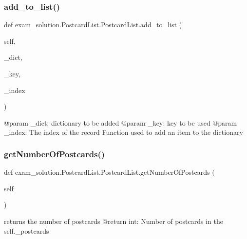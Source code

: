 \subsubsection{\texorpdfstring{add\_to\_list()}{add\_to\_list()}}
{\footnotesize\ttfamily def exam\+\_\+solution.\+Postcard\+List.\+Postcard\+List.\+add\+\_\+to\+\_\+list (\begin{DoxyParamCaption}\item[{}]{self,  }\item[{}]{\+\_\+dict,  }\item[{}]{\+\_\+key,  }\item[{}]{\+\_\+index }\end{DoxyParamCaption})}

\begin{DoxyVerb}@param _dict: dictionary to be added
@param _key: key to be used 
@param _index: The index of the record
Function used to add an item to the dictionary
\end{DoxyVerb}
 \mbox{\label{classexam__solution_1_1PostcardList_1_1PostcardList_ae8a04db1a0fb41601dcf30c6c771f849}} 
\subsubsection{\texorpdfstring{getNumberOfPostcards()}{getNumberOfPostcards()}}
{\footnotesize\ttfamily def exam\+\_\+solution.\+Postcard\+List.\+Postcard\+List.\+get\+Number\+Of\+Postcards (\begin{DoxyParamCaption}\item[{}]{self }\end{DoxyParamCaption})}

\begin{DoxyVerb}returns the number of postcards
@return int: Number of postcards in the self._postcards
\end{DoxyVerb}
 \mbox{\label{classexam__solution_1_1PostcardList_1_1PostcardList_a58aaec779048c09830906e010227da02}} 
